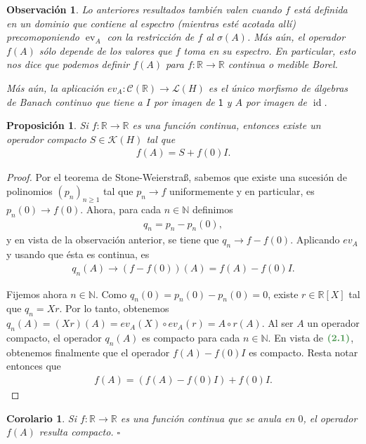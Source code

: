 \documentclass[11pt]{report}
\theoremstyle{colored}
\newtheorem{proposition}{Proposición}[section]
\newtheorem{corollary}{Corolario}[section]
\newtheorem{remark}{Observación}[section]
\newcommand{\N}{\mathbb{N}}
\newcommand{\R}{\mathbb{R}}
\newcommand{\ev}{\operatorname{ev}}
\newcommand{\id}{\operatorname{id}}
\newcommand{\paint}[1]{\color{color}{#1}}
\newcommand{\tpaint}[1]{\paint{\textbf{#1}}}
\begin{document}
\begin{remark} Lo anteriores resultados también valen cuando $f$ está definida en un dominio que contiene al espectro (mientras esté acotada allí) precomoponiendo $\ev_A$ con la restricción de $f$ al $\sigma(A)$. Más aún, el operador $f(A)$ sólo depende de los valores que $f$ toma en su espectro. En particular, esto nos dice que podemos definir $f(A)$ para $f : \R \to \R$ continua o medible Borel. 

Más aún, la aplicación $ev_A : \mathcal{C}(\R) \to \mathscr{L}(H)$ es el único morfismo de álgebras de Banach continuo que tiene a $I$ por imagen de $\mathsf{1}$ y $A$ por imagen de $\id$.
\end{remark}

\begin{proposition} Si $f : \R \to \R$ es una función continua, entonces existe un operador compacto $S \in \mathscr{K}(H)$ tal que
\begin{align*}
f(A) = S + f(0)I.
\end{align*}
\end{proposition}
\begin{proof} Por el teorema de Stone-Weierstraß, sabemos que existe una sucesión de polinomios $(p_n)_{n \geq 1}$ tal que $p_n \to f$ uniformemente y en particular, es $p_n(0) \to f(0)$. Ahora, para cada $n \in \N$ definimos
\begin{align*}
q_n = p_n - p_n(0),
\end{align*} 
y en vista de la observación anterior, se tiene que $q_n \to f - f(0)$. Aplicando $ev_A$ y usando que ésta es continua, es
\begin{align}
q_n(A) \to (f-f(0))(A) = f(A) - f(0)I.
\end{align}

Fijemos ahora $n \in \N$. Como $q_n(0) = p_n(0) - p_n(0) = 0$, existe $r \in \R[X]$ tal que $q_n = Xr$. Por lo tanto, obtenemos $q_n(A) = (Xr)(A) = ev_A(X) \circ ev_A(r) = A \circ r(A)$. Al ser $A$ un operador compacto, el operador $q_n(A)$ es compacto para cada $n \in \N$. En vista de $\tpaint{(2.1)}$, obtenemos finalmente que el operador $f(A) - f(0)I$ es compacto. Resta notar entonces que
\begin{align*}
f(A) = (f(A)-f(0)I) + f(0)I.
\end{align*}  
\end{proof}

\begin{corollary} Si $f : \R \to \R$ es una función continua que se anula en $0$, el operador $f(A)$ resulta compacto. $\square$
\end{corollary}
\end{document}
